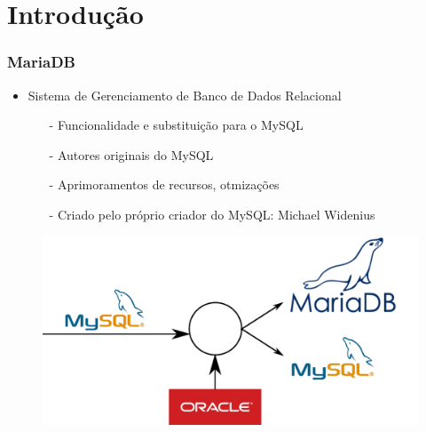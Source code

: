 \documentclass[10pt]{beamer}
\begin{document}
\section{Introdução}

\begin{frame}[fragile]
  \frametitle{MariaDB}

    \begin{itemize}
      \item Sistema de Gerenciamento de Banco de Dados Relacional
      \begin{itemize}
        \item[-] Funcionalidade e substituição para o MySQL
        \item[-] Autores originais do MySQL
        \item[-] Aprimoramentos de recursos, otmizações
        \item[-] Criado pelo próprio criador do MySQL: Michael Widenius
      \end{itemize}

    \end{itemize}

  
    \begin{figure}[htb]
    \begin{center}
        \includegraphics[scale=0.5]{img/mariadb.pdf}
    \end{center}
  \end{figure}

\end{frame}
\end{document}
